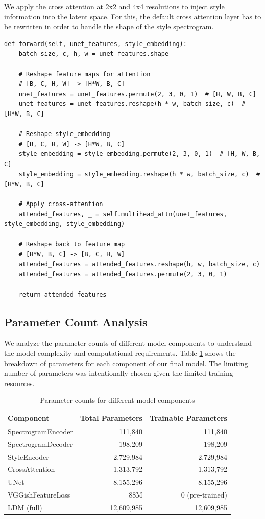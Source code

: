 We apply the cross attention at 2x2 and 4x4 resolutions to inject style information into the latent space. For this, the default cross attention layer has to be rewritten in order to handle the shape of the style spectrogram.
\begin{lstlisting}[basicstyle=\tiny]
def forward(self, unet_features, style_embedding):
    batch_size, c, h, w = unet_features.shape

    # Reshape feature maps for attention
    # [B, C, H, W] -> [H*W, B, C]
    unet_features = unet_features.permute(2, 3, 0, 1)  # [H, W, B, C]
    unet_features = unet_features.reshape(h * w, batch_size, c)  # [H*W, B, C]
    
    # Reshape style_embedding
    # [B, C, H, W] -> [H*W, B, C]
    style_embedding = style_embedding.permute(2, 3, 0, 1)  # [H, W, B, C]
    style_embedding = style_embedding.reshape(h * w, batch_size, c)  # [H*W, B, C]

    # Apply cross-attention
    attended_features, _ = self.multihead_attn(unet_features, style_embedding, style_embedding)
    
    # Reshape back to feature map
    # [H*W, B, C] -> [B, C, H, W]
    attended_features = attended_features.reshape(h, w, batch_size, c)
    attended_features = attended_features.permute(2, 3, 0, 1)
    
    return attended_features
\end{lstlisting}

\subsection{Parameter Count Analysis}

We analyze the parameter counts of different model components to understand the model complexity and computational requirements. Table \ref{tab:param_counts} shows the breakdown of parameters for each component of our final model. The limiting number of parameters was intentionally chosen given the limited training resources.

\begin{table}[h]
\centering
\caption{Parameter counts for different model components}
\label{tab:param_counts}
\begin{tabular}{lrr}
\hline
\textbf{Component} & \textbf{Total Parameters} & \textbf{Trainable Parameters} \\
\hline
SpectrogramEncoder & 111,840 & 111,840 \\
SpectrogramDecoder & 198,209 & 198,209 \\
StyleEncoder & 2,729,984 & 2,729,984 \\
CrossAttention & 1,313,792 & 1,313,792 \\
UNet & 8,155,296 & 8,155,296 \\
VGGishFeatureLoss & 88M & 0 (pre-trained)\\
\hline
LDM (full) & 12,609,985 & 12,609,985 \\
\hline
\end{tabular}
\end{table}

